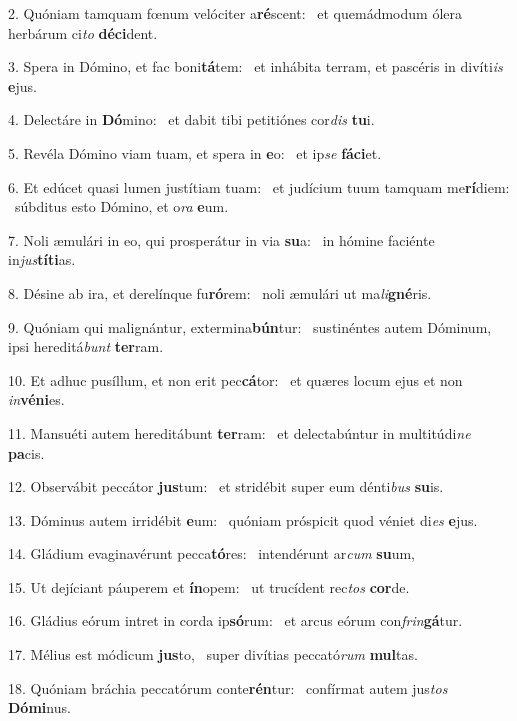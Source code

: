 2. Quóniam tamquam fœnum velóciter a\textbf{ré}scent: \ast\  et quemádmodum ólera herbárum ci\textit{to} \textbf{dé}\textbf{ci}dent.\

3. Spera in Dómino, et fac boni\textbf{tá}tem: \ast\  et inhábita terram, et pascéris in divíti\textit{is} \textbf{e}jus.\

4. Delectáre in \textbf{Dó}mino: \ast\  et dabit tibi petitiónes cor\textit{dis} \textbf{tu}i.\

5. Revéla Dómino viam tuam, et spera in \textbf{e}o: \ast\  et ip\textit{se} \textbf{fá}\textbf{ci}et.\

6. Et edúcet quasi lumen justítiam tuam: \dag\  et judícium tuum tamquam me\textbf{rí}diem: \ast\  súbditus esto Dómino, et o\textit{ra} \textbf{e}um.\

7. Noli æmulári in eo, qui prosperátur in via \textbf{su}a: \ast\  in hómine faciénte in\textit{jus}\textbf{tí}\textbf{ti}as.\

8. Désine ab ira, et derelínque fu\textbf{ró}rem: \ast\  noli æmulári ut ma\textit{li}\textbf{gné}ris.\

9. Quóniam qui malignántur, extermina\textbf{bún}tur: \ast\  sustinéntes autem Dóminum, ipsi hereditá\textit{bunt} \textbf{ter}ram.\

10. Et adhuc pusíllum, et non erit pec\textbf{cá}tor: \ast\  et quæres locum ejus et non \textit{in}\textbf{vé}\textbf{ni}es.\

11. Mansuéti autem hereditábunt \textbf{ter}ram: \ast\  et delectabúntur in multitúdi\textit{ne} \textbf{pa}cis.\

12. Observábit peccátor \textbf{jus}tum: \ast\  et stridébit super eum dénti\textit{bus} \textbf{su}is.\

13. Dóminus autem irridébit \textbf{e}um: \ast\  quóniam próspicit quod véniet di\textit{es} \textbf{e}jus.\

14. Gládium evaginavérunt pecca\textbf{tó}res: \ast\  intendérunt ar\textit{cum} \textbf{su}um,\

15. Ut dejíciant páuperem et \textbf{ín}opem: \ast\  ut trucídent rec\textit{tos} \textbf{cor}de.\

16. Gládius eórum intret in corda ip\textbf{só}rum: \ast\  et arcus eórum con\textit{frin}\textbf{gá}tur.\

17. Mélius est módicum \textbf{jus}to, \ast\  super divítias peccató\textit{rum} \textbf{mul}tas.\

18. Quóniam bráchia peccatórum conte\textbf{rén}tur: \ast\  confírmat autem jus\textit{tos} \textbf{Dó}\textbf{mi}nus.\

